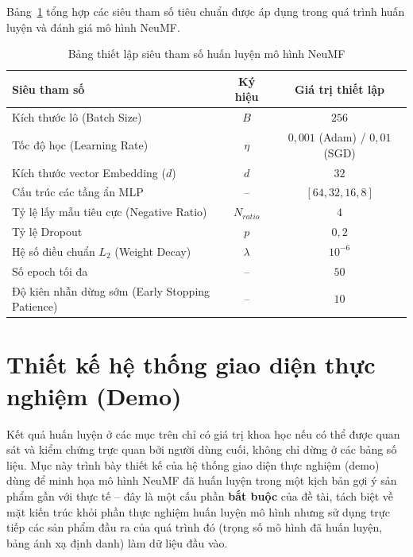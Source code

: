 Bảng~\ref{tab:hyperparams} tổng hợp các siêu tham số tiêu chuẩn được áp dụng trong quá trình huấn luyện và đánh giá mô hình NeuMF.

\begin{table}[htbp]
    \centering
    \caption{Bảng thiết lập siêu tham số huấn luyện mô hình NeuMF}
    \label{tab:hyperparams}
    \begin{tabularx}{\textwidth}{|X|c|c|}
        \hline
        \textbf{Siêu tham số} & \textbf{Ký hiệu} & \textbf{Giá trị thiết lập} \\
        \hline
        Kích thước lô (Batch Size) & $B$ & $256$ \\
        \hline
        Tốc độ học (Learning Rate) & $\eta$ & $0{,}001$ (Adam) / $0{,}01$ (SGD) \\
        \hline
        Kích thước vector Embedding ($d$) & $d$ & $32$ \\
        \hline
        Cấu trúc các tầng ẩn MLP & -- & $[64, 32, 16, 8]$ \\
        \hline
        Tỷ lệ lấy mẫu tiêu cực (Negative Ratio) & $N_{ratio}$ & $4$ \\
        \hline
        Tỷ lệ Dropout & $p$ & $0{,}2$ \\
        \hline
        Hệ số điều chuẩn $L_2$ (Weight Decay) & $\lambda$ & $10^{-6}$ \\
        \hline
        Số epoch tối đa & -- & $50$ \\
        \hline
        Độ kiên nhẫn dừng sớm (Early Stopping Patience) & -- & $10$ \\
        \hline
    \end{tabularx}
\end{table}

\section{Thiết kế hệ thống giao diện thực nghiệm (Demo)}
\label{sec:demo_design}

Kết quả huấn luyện ở các mục trên chỉ có giá trị khoa học nếu có thể được quan sát và kiểm chứng trực quan bởi người dùng cuối, không chỉ dừng ở các bảng số liệu. Mục này trình bày thiết kế của hệ thống giao diện thực nghiệm (demo) dùng để minh họa mô hình NeuMF đã huấn luyện trong một kịch bản gợi ý sản phẩm gần với thực tế -- đây là một cấu phần \textbf{bắt buộc} của đề tài, tách biệt về mặt kiến trúc khỏi phần thực nghiệm huấn luyện mô hình nhưng sử dụng trực tiếp các sản phẩm đầu ra của quá trình đó (trọng số mô hình đã huấn luyện, bảng ánh xạ định danh) làm dữ liệu đầu vào.

